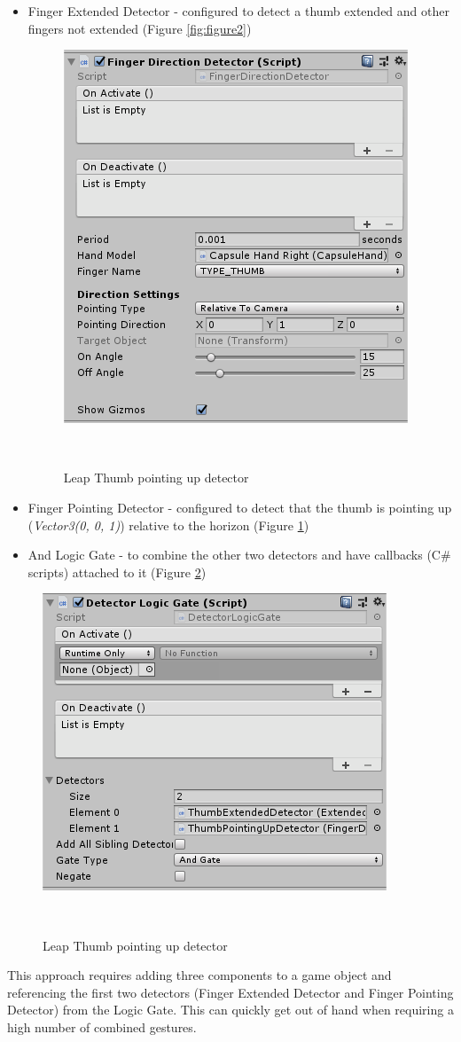 \documentclass{sigchi}
\begin{document}
\begin{itemize}
  \item Finger Extended Detector - configured to detect a thumb extended and other fingers not extended (Figure \ref{fig:figure2})
    \begin{figure}[!b]
      \centering
      \includegraphics[width=0.7\columnwidth]{figures/ThumbPointingUpDetector.PNG}
      \caption{Leap Thumb pointing up detector}~\label{fig:figure3}
\end{figure}
  \item Finger Pointing Detector - configured to detect that the thumb is pointing up (\textit{Vector3(0, 0, 1)}) relative to the horizon (Figure \ref{fig:figure3})
    
  \item And Logic Gate - to combine the other two detectors and have callbacks (C\# scripts) attached to it (Figure \ref{fig:figure4})
    
\end{itemize}


\begin{figure}[!t]
      \centering
      \includegraphics[width=0.7\columnwidth]{figures/ThumbsUpDtector.PNG}
      \caption{Leap Thumb pointing up detector}~\label{fig:figure4}
\end{figure}
This approach requires adding three components to a game object and referencing the first two detectors (Finger Extended Detector and Finger Pointing Detector) from the Logic Gate. This can quickly get out of hand when requiring a high number of combined gestures.
\end{document}
